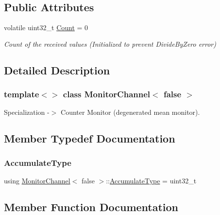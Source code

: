 \subsection*{Public Attributes}
\begin{DoxyCompactItemize}
\item 
volatile uint32\+\_\+t \hyperlink{classMonitorChannel_3_01false_01_4_a9642a29309b4919130d0fb9573af3a05}{Count} = 0
\begin{DoxyCompactList}\small\item\em Count of the received values (Initialized to prevent Divide\+By\+Zero error) \end{DoxyCompactList}\end{DoxyCompactItemize}


\subsection{Detailed Description}
\subsubsection*{template$<$$>$\newline
class Monitor\+Channel$<$ false $>$}

Specialization -\/$>$ Counter Monitor (degenerated mean monitor). 

\subsection{Member Typedef Documentation}
\mbox{\label{classMonitorChannel_3_01false_01_4_a72d6a503399e9e8e986f0258d508a1b2}} 
\subsubsection{\texorpdfstring{Accumulate\+Type}{AccumulateType}}
{\footnotesize\ttfamily using \hyperlink{classMonitorChannel}{Monitor\+Channel}$<$ false $>$\+::\hyperlink{classMonitorChannel_3_01false_01_4_a72d6a503399e9e8e986f0258d508a1b2}{Accumulate\+Type} =  uint32\+\_\+t}



\subsection{Member Function Documentation}
\mbox{\label{classMonitorChannel_3_01false_01_4_a55677fe669bca6b9382fc3baa73162b9}} 
